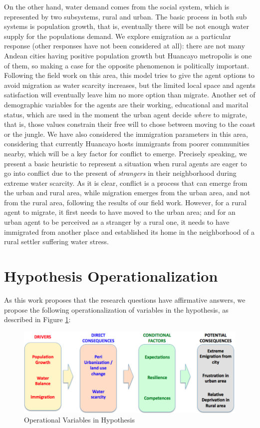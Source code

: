 \documentclass{article}
\begin{document}
On the other hand, water demand comes from the social system, which is represented by two subsystems, rural and urban. The basic process in both sub systems is population growth, that is, eventually there will be not enough water supply for the population\textquotesingle s demand. We explore emigration as a particular response (other responses have not been considered at all): there are not many Andean cities having positive population growth but Huancayo metropolis is one of them, so making a case for the opposite phenomenon is politically important. Following the field work on this area, this model tries to give the agent options to avoid migration as water scarcity increases, but the limited local space and agent\textquotesingle s satisfaction will eventually leave him no more option than migrate. Another set of demographic variables for the agents are their working, educational and marital status, which are used in the moment the urban agent decide \emph{where} to migrate, that is, those values constrain their free will to chose between moving to the coast or the jungle. We have also considered the immigration parameters in this area, considering that currently Huancayo hosts immigrants from poorer communities nearby, which will be a key factor for conflict to emerge. Precisely speaking, we present a basic heuristic to represent a situation when rural agents are eager to go into conflict due to the present of \emph{strangers} in their neighborhood during extreme water scarcity. As it is clear, conflict is a process that can emerge from the urban and rural area, while migration emerges from the urban area, and not from the rural area, following the results of our field work. However, for a rural agent to migrate, it first needs to have moved to the urban area; and for an urban agent to be perceived as a stranger by a rural one, it needs to have immigrated from another place and established its home in the neighborhood of a rural settler suffering water stress.

\section{Hypothesis Operationalization}

As this work proposes that the research questions have affirmative answers, we propose the following operationalization of variables in the hypothesis, as described in Figure \ref{operational}:

\begin{figure}[h]
  \centering
  \includegraphics{operational}
  \caption[Operational Variables in Hypothesis]{Operational Variables in Hypothesis}
  \label{operational}
\end{figure}
\end{document}
